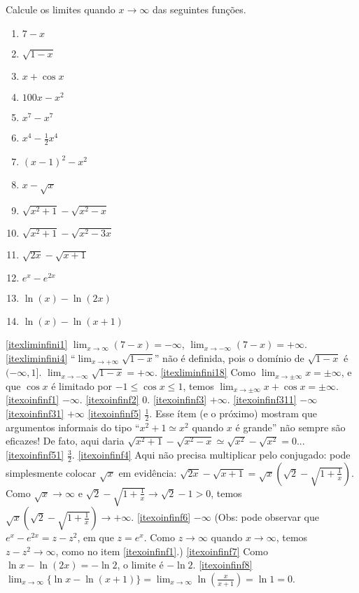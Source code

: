 \begin{exo}
Calcule os limites quando $x\to\infty$ das seguintes funções.
\begin{multicols}{3}
\begin{enumerate}
\item\label{itexliminfini1} $7-x$
\item\label{itexliminfini4} $\sqrt{1-x}$
\item\label{itexliminfini18} $x+\cos x$
\item\label{itexoinfinf1} $100x-x^2$
\item\label{itexoinfinf2} $x^7-x^7$
\item\label{itexoinfinf3} $x^4-\tfrac12 x^4$
\item\label{itexoinfinf311} $(x-1)^2-x^2$
\item\label{itexoinfinf31} $x-\sqrt{x}$
\item\label{itexoinfinf5} $\sqrt{x^2+1}-\sqrt{x^2-x}$
\item\label{itexoinfinf51} $\sqrt{x^2+1}-\sqrt{x^2-3x}$
\item\label{itexoinfinf4} $\sqrt{2x}-\sqrt{x+1}$
\item\label{itexoinfinf6} $e^x-e^{2x}$
\item\label{itexoinfinf7} $\ln(x)-\ln(2x)$
\item\label{itexoinfinf8} $\ln(x)-\ln(x+1)$
\end{enumerate}
\end{multicols}
\vspace{0.01cm}
\begin{sol}
\eqref{itexliminfini1} $\lim_{x\to\infty}(7-x)=-\infty$,
$\lim_{x\to-\infty}(7-x)=+\infty$.
\eqref{itexliminfini4} ``$\lim_{x\to +\infty}\sqrt{1-x}$'' não é
definida, pois o domínio de $\sqrt{1-x}$ é $(-\infty,1]$. 
$\lim_{x\to -\infty}\sqrt{1-x}=+\infty$.
\eqref{itexliminfini18} Como $\lim_{x\to\pm\infty}
x=\pm\infty$, e que $\cos x$ é limitado por $-1\leq \cos x\leq 1$,
temos $\lim_{x\to \pm\infty}x+\cos x=\pm\infty$.
\eqref{itexoinfinf1} $-\infty$.
\eqref{itexoinfinf2} $0$.
\eqref{itexoinfinf3} $+\infty$.
\eqref{itexoinfinf311} $-\infty$
\eqref{itexoinfinf31} $+\infty$
\eqref{itexoinfinf5} $\frac12$.
Esse ítem (e o próximo) mostram que argumentos informais do tipo
``$x^2+1\simeq x^2$
quando $x$ é grande'' não sempre são eficazes! De fato, aqui daria
$\sqrt{x^2+1}-\sqrt{x^2-x}\simeq \sqrt{x^2}-\sqrt{x^2}=0$...
\eqref{itexoinfinf51} $\frac32$. 
\eqref{itexoinfinf4} Aqui não precisa multiplicar pelo conjugado: pode
simplesmente colocar $\sqrt{x}$ em evidência:
$\sqrt{2x}-\sqrt{x+1}=\sqrt{x}(\sqrt{2}-\sqrt{1+\frac1x})$. Como
$\sqrt{x}\to\infty$ e $\sqrt{2}-\sqrt{1+\frac1x}\to \sqrt{2}-1>0$,
temos $\sqrt{x}(\sqrt{2}-\sqrt{1+\frac1x})\to +\infty$.
\eqref{itexoinfinf6} $-\infty$ (Obs: pode observar que $e^x-e^{2x}=z-z^2$, em que $z=e^x$. Como $z\to \infty$ 
quando $x\to\infty$, temos $z-z^2\to \infty$, como no item \eqref{itexoinfinf1}.)
\eqref{itexoinfinf7} Como $\ln x-\ln(2x)=-\ln 2$, o limite é $-\ln 2$.
\eqref{itexoinfinf8} $\lim_{x\to \infty}\{\ln x-\ln(x+1)\}=
\lim_{x\to \infty}\ln (\frac{x}{x+1})=\ln 1=0$.
\end{sol}
\end{exo}

